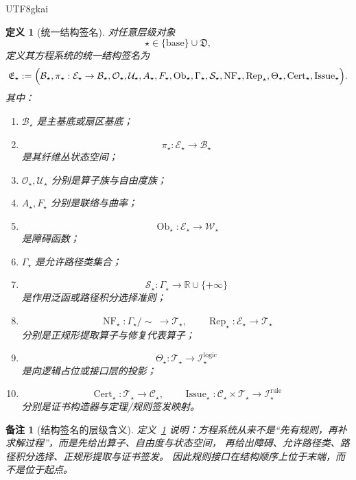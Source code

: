 \documentclass[12pt]{article}
\newtheorem{definition}{定义}[section]
\newtheorem{remark}{备注}[section]
\newcommand{\Ob}{\operatorname{Ob}}
\newcommand{\Cert}{\operatorname{Cert}}
\newcommand{\Issue}{\operatorname{Issue}}
\begin{document}
\begin{CJK*}{UTF8}{gkai}
\begin{definition}[统一结构签名]
\label{def:tex37-ch12-signature}
对任意层级对象
\[
  \star\in \{\mathrm{base}\}\cup\mathfrak D,
\]
定义其方程系统的统一结构签名为
\[
  \mathfrak E_\star
  :=
  \Bigl(
    \mathcal B_\star,
    \pi_\star:\mathcal E_\star\to \mathcal B_\star,
    \mathcal O_\star,
    \mathcal U_\star,
    A_\star,
    F_\star,
    \Ob_\star,
    \Gamma_\star,
    \mathcal S_\star,
    \operatorname{NF}_\star,
    \operatorname{Rep}_\star,
    \Theta_\star,
    \Cert_\star,
    \Issue_\star
  \Bigr).
\]
其中：
\begin{enumerate}
  \item $\mathcal B_\star$ 是主基底或扇区基底；
  \item
  \[
    \pi_\star:\mathcal E_\star\to \mathcal B_\star
  \]
  是其纤维丛状态空间；
  \item $\mathcal O_\star,\mathcal U_\star$ 分别是算子族与自由度族；
  \item $A_\star,F_\star$ 分别是联络与曲率；
  \item
  \[
    \Ob_\star:\mathcal E_\star\to \mathcal W_\star
  \]
  是障碍函数；
  \item $\Gamma_\star$ 是允许路径类集合；
  \item
  \[
    \mathcal S_\star:\Gamma_\star\to \mathbb{R}\cup\{+\infty\}
  \]
  是作用泛函或路径积分选择准则；
  \item
  \[
    \operatorname{NF}_\star:\Gamma_\star/\!\sim\ \to \mathcal T_\star,
    \qquad
    \operatorname{Rep}_\star:\mathcal E_\star\to \mathcal T_\star
  \]
  分别是正规形提取算子与修复代表算子；
  \item
  \[
    \Theta_\star:\mathcal T_\star\to \mathcal I_\star^{\mathrm{logic}}
  \]
  是向逻辑占位或接口层的投影；
  \item
  \[
    \Cert_\star:\mathcal T_\star\to \mathcal C_\star,
    \qquad
    \Issue_\star:\mathcal C_\star\times \mathcal T_\star\to \mathcal I_\star^{\mathrm{rule}}
  \]
  分别是证书构造器与定理/规则签发映射。
\end{enumerate}
\end{definition}

\begin{remark}[结构签名的层级含义]
定义~\ref{def:tex37-ch12-signature} 说明：方程系统从来不是“先有规则，再补求解过程”，而是先给出算子、自由度与状态空间，
再给出障碍、允许路径类、路径积分选择、正规形提取与证书签发。
因此规则接口在结构顺序上位于末端，而不是位于起点。
\end{remark}


\end{CJK*}
\end{document}
